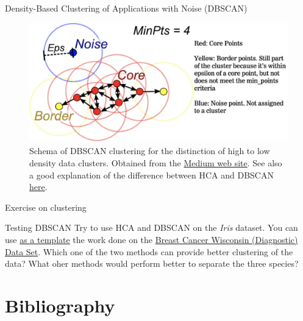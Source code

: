 \documentclass{beamer}
\begin{document}
\begin{frame}{Density-Based Clustering of Applications with Noise (DBSCAN)}
    \begin{figure}
        \includegraphics[width=0.7\linewidth]{DBSCAN}
        \caption{Schema of DBSCAN clustering for the distinction of high to low density data clusters. Obtained from the \href{https://elutins.medium.com/dbscan-what-is-it-when-to-use-it-how-to-use-it-8bd506293818}{Medium web site}. See also a good explanation of the difference between HCA and DBSCAN \href{https://ryanwingate.com/intro-to-machine-learning/unsupervised/hierarchical-and-density-based-clustering/}{here}.}
    \end{figure}
\end{frame}


\begin{frame}{Exercise on clustering}
    \begin{Exercise}{Testing DBSCAN}
        Try to use HCA and DBSCAN on the {\em Iris} dataset. You can use \href{https://www.kaggle.com/code/raphaelekete/cluster-analysis-of-breast-cancer-data-set/notebook}{as a template} the work done on the \href{https://archive.ics.uci.edu/dataset/17/breast+cancer+wisconsin+diagnostic}{Breast Cancer Wisconsin (Diagnostic) Data Set}. 
        Which one of the two methods can provide better clustering of the data? What oher methods would perform better to separate the three species?
    \end{Exercise}
\end{frame}


\section{Bibliography}


\end{document}
